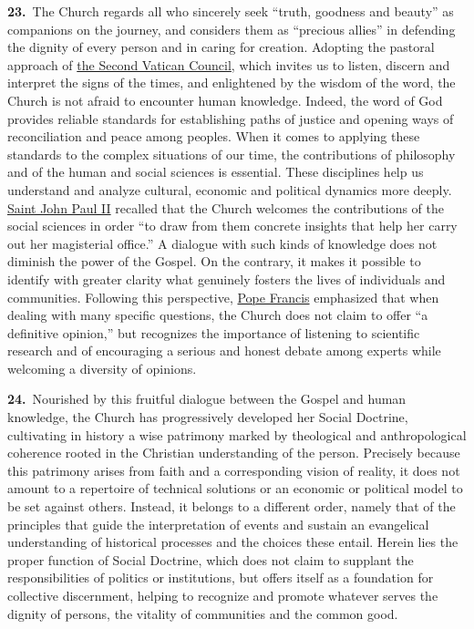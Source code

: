 \documentclass{article}
\begin{document}
\textbf{23.}\ The Church regards all who sincerely seek ``truth, goodness and beauty'' as companions on the journey, and considers them as ``precious allies''\cite{n12} in defending the dignity of every person and in caring for creation. Adopting the pastoral approach of \href{https://www.vatican.va/archive/hist_councils/ii_vatican_council/index.htm}{the Second Vatican Council}, which invites us to listen, discern and interpret the signs of the times, and enlightened by the wisdom of the word, the Church is not afraid to encounter human knowledge. Indeed, the word of God provides reliable standards for establishing paths of justice and opening ways of reconciliation and peace among peoples. When it comes to applying these standards to the complex situations of our time, the contributions of philosophy and of the human and social sciences is essential. These disciplines help us understand and analyze cultural, economic and political dynamics more deeply. \href{https://www.vatican.va/content/john-paul-ii/en.html}{Saint John Paul II} recalled that the Church welcomes the contributions of the social sciences in order ``to draw from them concrete insights that help her carry out her magisterial office.''\cite{n13} A dialogue with such kinds of knowledge does not diminish the power of the Gospel. On the contrary, it makes it possible to identify with greater clarity what genuinely fosters the lives of individuals and communities. Following this perspective, \href{https://www.vatican.va/content/francesco/en.html}{Pope Francis} emphasized that when dealing with many specific questions, the Church does not claim to offer ``a definitive opinion,''\cite{n14} but recognizes the importance of listening to scientific research and of encouraging a serious and honest debate among experts while welcoming a diversity of opinions.

\textbf{24.}\ Nourished by this fruitful dialogue between the Gospel and human knowledge, the Church has progressively developed her Social Doctrine, cultivating in history a wise patrimony marked by theological and anthropological coherence rooted in the Christian understanding of the person. Precisely because this patrimony arises from faith and a corresponding vision of reality, it does not amount to a repertoire of technical solutions or an economic or political model to be set against others. Instead, it belongs to a different order,\cite{n15} namely that of the principles that guide the interpretation of events and sustain an evangelical understanding of historical processes and the choices these entail. Herein lies the proper function of Social Doctrine, which does not claim to supplant the responsibilities of politics or institutions, but offers itself as a foundation for collective discernment, helping to recognize and promote whatever serves the dignity of persons, the vitality of communities and the common good.
\end{document}
